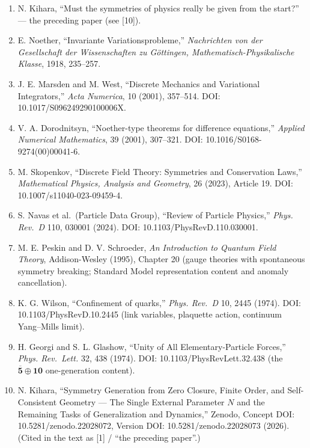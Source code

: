 \documentclass[
  a4paper,
]{article}
\providecommand{\tightlist}{%
  \setlength{\itemsep}{0pt}\setlength{\parskip}{0pt}}
\begin{document}
\begin{enumerate}
\def\labelenumi{\arabic{enumi}.}
\tightlist
\item
  N. Kihara, ``Must the symmetries of physics really be given from the
  start?'' --- the preceding paper (see {[}10{]}).
\item
  E. Noether, ``Invariante Variationsprobleme,'' \emph{Nachrichten von
  der Gesellschaft der Wissenschaften zu Göttingen,
  Mathematisch-Physikalische Klasse}, 1918, 235--257.
\item
  J. E. Marsden and M. West, ``Discrete Mechanics and Variational
  Integrators,'' \emph{Acta Numerica}, 10 (2001), 357--514. DOI:
  10.1017/S096249290100006X.
\item
  V. A. Dorodnitsyn, ``Noether-type theorems for difference equations,''
  \emph{Applied Numerical Mathematics}, 39 (2001), 307--321. DOI:
  10.1016/S0168-9274(00)00041-6.
\item
  M. Skopenkov, ``Discrete Field Theory: Symmetries and Conservation
  Laws,'' \emph{Mathematical Physics, Analysis and Geometry}, 26 (2023),
  Article 19. DOI: 10.1007/s11040-023-09459-4.
\item
  S. Navas et al.~(Particle Data Group), ``Review of Particle Physics,''
  \emph{Phys. Rev.~D} 110, 030001 (2024). DOI:
  10.1103/PhysRevD.110.030001.
\item
  M. E. Peskin and D. V. Schroeder, \emph{An Introduction to Quantum
  Field Theory}, Addison-Wesley (1995), Chapter 20 (gauge theories with
  spontaneous symmetry breaking; Standard Model representation content
  and anomaly cancellation).
\item
  K. G. Wilson, ``Confinement of quarks,'' \emph{Phys. Rev.~D} 10, 2445
  (1974). DOI: 10.1103/PhysRevD.10.2445 (link variables, plaquette
  action, continuum Yang--Mills limit).
\item
  H. Georgi and S. L. Glashow, ``Unity of All Elementary-Particle
  Forces,'' \emph{Phys. Rev.~Lett.} 32, 438 (1974). DOI:
  10.1103/PhysRevLett.32.438 (the
  \(\overline{\mathbf 5}\oplus\mathbf{10}\) one-generation content).
\item
  N. Kihara, ``Symmetry Generation from Zero Closure, Finite Order, and
  Self-Consistent Geometry --- The Single External Parameter \(N\) and
  the Remaining Tasks of Generalization and Dynamics,'' Zenodo, Concept
  DOI: 10.5281/zenodo.22028072, Version DOI: 10.5281/zenodo.22028073
  (2026). (Cited in the text as {[}1{]} / ``the preceding paper''.)
\end{enumerate}
\end{document}
